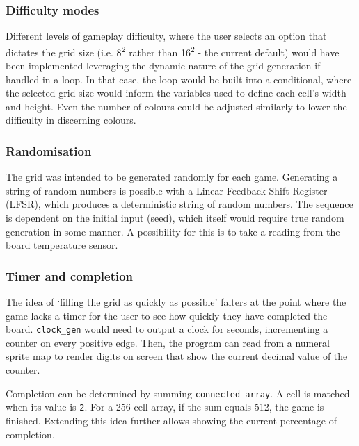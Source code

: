 \subsubsection{Difficulty modes}
Different levels of gameplay difficulty, where the user selects an option 
that dictates the grid size (i.e. 8\textsuperscript{2} rather 
than 16\textsuperscript{2} - the current default) would have been implemented 
leveraging the dynamic nature of the grid generation if handled in a loop. 
In that case, the loop would be built into a conditional, where the 
selected grid size would inform the variables used to define each cell's 
width and height. Even the number of colours could be adjusted similarly
to lower the difficulty in discerning colours. 

\subsubsection{Randomisation}\label{sec:randomisation}
The grid was intended to be generated randomly for each game. 
Generating a string of random numbers is possible with a Linear-Feedback Shift Register (LFSR),
which produces a deterministic string of random numbers. The sequence is dependent on the initial 
input (seed), which itself would require true random generation in some manner. 
A possibility for this is to take a reading from the board temperature sensor. 

\subsubsection{Timer and completion}
The idea of `filling the grid as quickly as possible' falters at the point 
where the game lacks a timer for the user to see how quickly they have completed the board. 
\lstinline|clock_gen| would need to output a clock for seconds, incrementing a counter 
on every positive edge. Then, the program can
read from a numeral sprite map to render digits on screen that show the current 
decimal value of the counter.

Completion can be determined by summing \lstinline|connected_array|. A cell is matched 
when its value is \lstinline|2|. For a 256 cell array, if the sum equals 512, 
the game is finished. Extending this idea further allows showing the current 
percentage of completion. 
